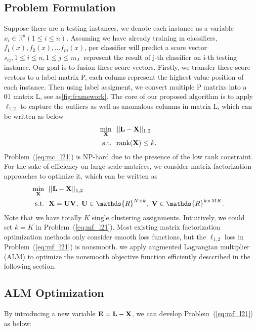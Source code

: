 \documentclass[letterpaper]{article}
\def\bE{{\bf E}}
\def\bL{{\bf L}}
\def\bU{{\bf U}}
\def\bV{{\bf V}}
\def\dsR{\mathds{R}}
\def\bX{{\bf X}}
\def\bX{{\bf X}}
\def\st{{\text{s.t.}}}
\def\rank{{\text{rank}}}
\begin{document}
\subsection{Problem Formulation}
Suppose there are n testing instances, we denote each instance as a variable $x_i \in \dsR^d (1{\leq}i{\leq}n)$. Assuming we have already training m classifiers, $f_1(x), f_2(x), ... f_m(x)$, per classifier will predict a score vector $s_{ij}, 1{\leq}i{\leq}n, 1{\leq}j{\leq}m$，represent the result of j-th classifier on i-th testing instance. Our goal is to fusion these score vectors. Firstly, we transfer these score vectors to a label matrix P, each colums represent the highest value position of each instance. Then using label assigment, we convert multiple P matrixs into a 01 matrix L, see as{\ref{fig:framework}}.
The core of our proposed algorithm is to apply $\ell_{1,2}$ to capture the outliers as well as anomalous columns in matrix L, which can be written as below
\begin{align}\label{eq:mc_l21}
  \min_{\bX} ~&~ || \bL - \bX ||_{1,2}    \nonumber \\
  \st        ~&~ \rank(\bX) \leq k  .
\end{align}
Problem~(\ref{eq:mc_l21}) is NP-hard due to the presence of the low rank constraint.
For the sake of efficiency on large scale matrices, we consider matrix factorization approaches to optimize it, which can be written as
\begin{align}\label{eq:mf_l21}
  \min_{\bX} ~&~ || \bL - \bX ||_{1,2}    \nonumber \\
  \st        ~&~ \bX = \bU \bV,~\bU \in \dsR^{N \times k},~\bV \in \dsR^{k \times MK} .
\end{align}
\noindent
Note that we have totally $K$ single clustering assignments.
Intuitively, we could set $k = K$ in Problem~(\ref{eq:mf_l21}).
Most existing matrix factorization optimization methods only consider smooth loss functions,
but the $\ell_{1,2}$ loss in Problem~(\ref{eq:mf_l21}) is nonsmooth.
we apply augmented Lagrangian multiplier (ALM) to optimize the nonsmooth objective function efficiently desccribed in the following section.

\subsection{ALM Optimization}

By introducing a new variable $\bE = \bL - \bX$, we can develop Problem~(\ref{eq:mf_l21}) as below:
\end{document}
